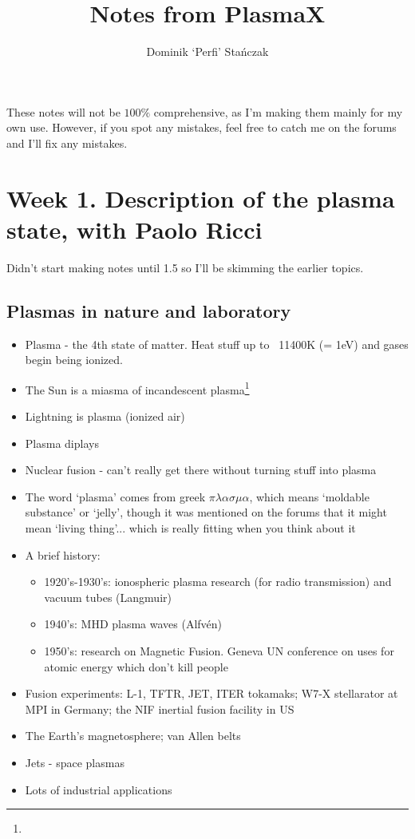 
\usepackage[utf8]{inputenc}
\usepackage{graphicx}
\title{Notes from PlasmaX}
\author{Dominik `Perfi' Stańczak}


\maketitle

These notes will not be $100\%$ comprehensive, as I'm making them mainly for my own use. However, if you spot any mistakes, feel free to catch me on the forums and I'll fix any mistakes. 

\section{Week 1. Description of the plasma state, with Paolo Ricci}
Didn't start making notes until 1.5 so I'll be skimming the earlier topics.
	\subsection{Plasmas in nature and laboratory}
		\begin{itemize}
			\item Plasma - the 4th state of matter. Heat stuff up to ~11400K (= 1eV) and gases begin being ionized.
			\item The Sun is a miasma of incandescent plasma\footnote{}
			\item Lightning is plasma (ionized air)
			\item Plasma diplays
			\item Nuclear fusion - can't really get there without turning stuff into plasma
	\item The word `plasma' comes from greek $\pi\lambda\alpha\sigma\mu\alpha$, which means `moldable substance' or `jelly', though it was mentioned on the forums that it might mean `living thing'... which is really fitting when you think about it
			\item A brief history:
				\begin{itemize}
					\item 1920's-1930's: ionospheric plasma research (for radio transmission) and vacuum tubes (Langmuir)
					\item 1940's: MHD plasma waves (Alfvén)
					\item 1950's: research on Magnetic Fusion. Geneva UN conference on uses for atomic energy which don't kill people
				\end{itemize}
			\item Fusion experiments: L-1, TFTR, JET, ITER tokamaks; W7-X stellarator at MPI in Germany; the NIF inertial fusion facility in US
			\item The Earth's magnetosphere; van Allen belts
			\item Jets - space plasmas
			\item Lots of industrial applications
		\end{itemize}
		
